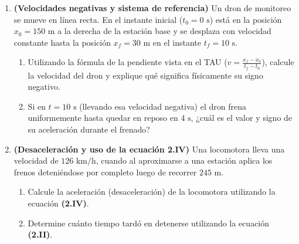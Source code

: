 \documentclass[11pt, letterpaper]{article}
\newif\ifmostrarrespuestas
\newcommand{\respuesta}[1]{
	\ifmostrarrespuestas
	\par\vspace{0.2cm}
	\begin{tcolorbox}[colback=blue!5!white, colframe=valblue, boxrule=0.5pt, arc=1mm, left=2mm, right=2mm, top=1.5mm, bottom=1.5mm]
		\footnotesize \textbf{\textcolor{valblue}{Solución:}} \textcolor{blue!80!black}{#1}
	\end{tcolorbox}
	\vspace{0.2cm}
	\fi
}
\begin{document}
\begin{enumerate}[leftmargin=*, itemsep=0.6cm]
		\item \textbf{(Velocidades negativas y sistema de referencia)} Un dron de monitoreo se mueve en línea recta. En el instante inicial ($t_0 = 0\text{ s}$) está en la posición $x_0 = 150\text{ m}$ a la derecha de la estación base y se desplaza con velocidad constante hasta la posición $x_f = 30\text{ m}$ en el instante $t_f = 10\text{ s}$.
		\begin{enumerate}[label=\alph*., itemsep=0.2cm]
			\item Utilizando la fórmula de la pendiente vista en el TAU ($v = \frac{x_f - x_0}{t_f - t_0}$), calcule la velocidad del dron y explique qué significa físicamente su signo negativo.
			\item Si en $t = 10\text{ s}$ (llevando esa velocidad negativa) el dron frena uniformemente hasta quedar en reposo en $4\text{ s}$, ¿cuál es el valor y signo de su aceleración durante el frenado?
		\end{enumerate}
		\respuesta{
			\textbf{a)} $v = \frac{30\text{ m} - 150\text{ m}}{10\text{ s} - 0\text{ s}} = \frac{-120\text{ m}}{10\text{ s}} = \mathbf{-12\text{ m/s}}$. El signo negativo indica que el dron se desplaza en sentido contrario al sistema de referencia positivo (regresando hacia el origen).\\[0.1cm]
			\textbf{b)} Datos: $v_0 = -12\text{ m/s}$, $v_f = 0\text{ m/s}$ (reposo), $t = 4\text{ s}$. Con ec. (2.II): $a = \frac{0 - (-12\text{ m/s})}{4\text{ s}} = \mathbf{+3\text{ m/s}^2}$. La aceleración resulta positiva porque la fuerza de frenado apunta hacia el sentido positivo para oponerse a la velocidad negativa.
		}
		
		\item \textbf{(Desaceleración y uso de la ecuación 2.IV)} Una locomotora lleva una velocidad de $126\text{ km/h}$, cuando al aproximarse a una estación aplica los frenos deteniéndose por completo luego de recorrer $245\text{ m}$.
		\begin{enumerate}[label=\alph*., itemsep=0.2cm]
			\item Calcule la aceleración (desaceleración) de la locomotora utilizando la ecuación \textbf{(2.IV)}.
			\item Determine cuánto tiempo tardó en detenerse utilizando la ecuación \textbf{(2.II)}.
		\end{enumerate}
		\respuesta{
			Convertimos: $v_0 = 126\text{ km/h} = 35\text{ m/s}$; $v_f = 0\text{ m/s}$; $\Delta x = 245\text{ m}$.\\[0.1cm]
			\textbf{a)} De $v_f^2 = v_0^2 + 2a\Delta x \implies 0 = (35)^2 + 2a(245) \implies -1225 = 490a \implies a = \frac{-1225}{490} = \mathbf{-2.5\text{ m/s}^2}$.\\[0.1cm]
			\textbf{b)} De $a = \frac{v_f - v_0}{t} \implies t = \frac{0 - 35\text{ m/s}}{-2.5\text{ m/s}^2} = \mathbf{14\text{ s}}$.
		}
		

\end{enumerate}
\end{document}

